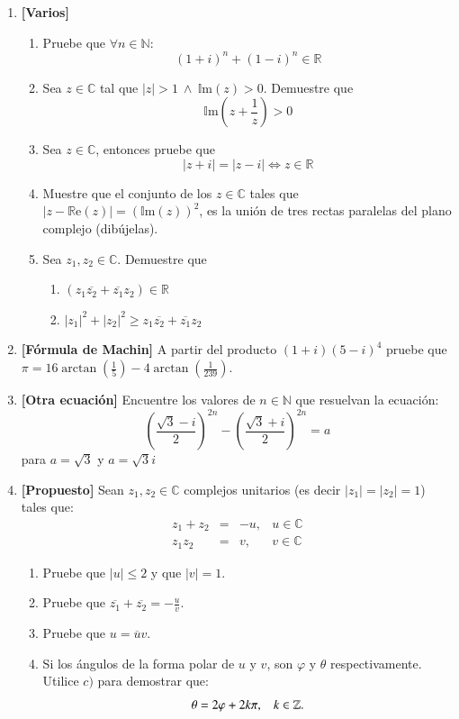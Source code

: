 \documentclass[letterpaper,10pt]{article}
\newcommand{\R}{\mathbb R}
\newcommand{\N}{\mathbb N}
\newcommand{\Z}{\mathbb Z}
\newcommand{\C}{\mathbb C}
\newcommand{\re}{\mathbb R \text{e}}
\newcommand{\im}{\mathbb I \text{m}}
\newcommand{\ssi}{\Longleftrightarrow} %
\theoremstyle{plain}
\begin{document}
\begin{enumerate}[\bf P1.]
\item \textbf{[Varios]}
    \begin{enumerate}
        \item Pruebe que $\forall n \in \N$:
            $$(1+i)^n+(1-i)^n \in \R$$
        \item Sea $z\in \C$ tal que $|z|>1 ~ \land ~ \im(z)>0$. Demuestre que $$\im(z+\frac{1}{z})>0  $$
        \item Sea $z\in \C$, entonces pruebe que $$ |z+i|=|z-i| \ssi z \in \R $$
        \item Muestre que el conjunto de los $z\in \C$ tales que $|z - \re(z)|=(\im(z))^{2}$, es la unión de tres rectas paralelas del plano complejo (dibújelas).
        \item Sea $z_1,z_2 \in \C$. Demuestre que
            \begin{enumerate}
                \item $(z_1\overline{z_2}+\overline{z_1}z_2)\in \R$
                \item $|z_1|^2+|z_2|^2\geq z_1\overline{z_2}+\overline{z_1}z_2$
            \end{enumerate}
    \end{enumerate}


\item \textbf{[Fórmula de Machin]} A partir del producto $(1+i)(5-i)^4$ pruebe que $ \pi = 16\arctan \left(\frac{1}{5}\right) - 4\arctan \left(\frac{1}{239}\right)$.

\item \textbf{[Otra ecuación]} Encuentre los valores de $n\in \N$ que resuelvan la ecuación:
$$\left(\dfrac{\sqrt{3}-i}{2}\right)^{2n}-\left(\dfrac{\sqrt{3}+i}{2}\right)^{2n} =a$$
para $a=\sqrt{3}$ y $a=\sqrt{3}i$

\item \textbf{[Propuesto]}%
Sean $z_1,z_2 \in \C$ complejos unitarios (es decir $|z_1|=|z_2|=1$) tales que:
$$
\begin{array}{rclr}
z_1+z_2 & = & -u, & u \in \C \\
z_1 z_2 & = & v, & v \in \C
\end{array}
$$
\begin{enumerate}
	\item Pruebe que $|u|\leq 2$ y que $|v|=1$.
	\item Pruebe que $\displaystyle\overline{z_1}+\overline{z_2}=- \frac{u}{v}$.
	\item Pruebe que $u=\overline{u}v$.
	\item Si los ángulos de la forma polar de $u$ y $v$, son $\varphi$ y $\theta$ respectivamente. Utilice $c)$ para demostrar que:
	$$
	\theta = 2 \varphi + 2k\pi , \hspace{3 mm} k \in \Z. 
	$$
\end{enumerate}


\end{enumerate}
\end{document}
